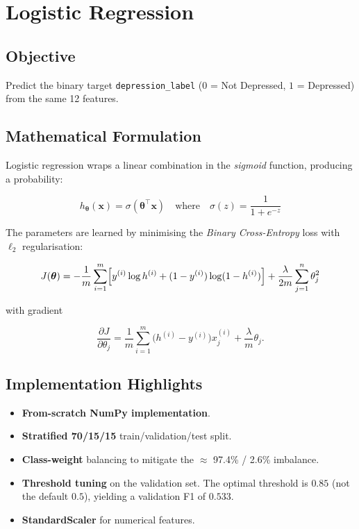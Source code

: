 \documentclass[11pt,a4paper]{article}
\begin{document}
\newpage
\section{Logistic Regression}

\subsection{Objective}
Predict the binary target \texttt{depression\_label} ($0$ = Not Depressed,
$1$ = Depressed) from the same 12 features.

\subsection{Mathematical Formulation}

Logistic regression wraps a linear combination in the \emph{sigmoid}
function, producing a probability:

\begin{equation}
    h_{\boldsymbol{\theta}}(\mathbf{x}) = \sigma(\boldsymbol{\theta}^{\top} \mathbf{x})
    \quad \text{where} \quad
    \sigma(z) = \frac{1}{1 + e^{-z}}
\end{equation}

The parameters are learned by minimising the \emph{Binary Cross-Entropy}
loss with $\ell_2$ regularisation:

\begin{equation}
    J(\boldsymbol{\theta}) = -\frac{1}{m} \sum_{i=1}^{m} \Bigl[ y^{(i)} \log h^{(i)} + (1 - y^{(i)}) \log(1 - h^{(i)}) \Bigr]
    + \frac{\lambda}{2m} \sum_{j=1}^{n} \theta_j^{2}
\end{equation}

with gradient

\begin{equation}
    \frac{\partial J}{\partial \theta_j}
    = \frac{1}{m} \sum_{i=1}^{m} \bigl( h^{(i)} - y^{(i)} \bigr) x_j^{(i)} + \frac{\lambda}{m} \theta_j.
\end{equation}

\subsection{Implementation Highlights}

\begin{itemize}[leftmargin=*, itemsep=2pt]
    \item \textbf{From-scratch NumPy implementation}.
    \item \textbf{Stratified 70/15/15} train/validation/test split.
    \item \textbf{Class-weight} balancing to mitigate the $\approx$ 97.4\% / 2.6\%
        imbalance.
    \item \textbf{Threshold tuning} on the validation set. The optimal threshold
        is $0.85$ (not the default $0.5$), yielding a validation F1 of $0.533$.
    \item \textbf{StandardScaler} for numerical features.
\end{itemize}
\end{document}
